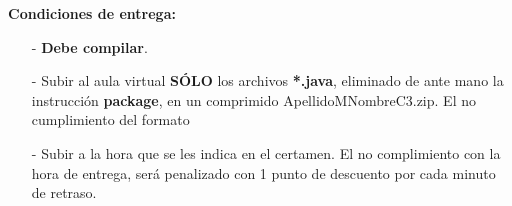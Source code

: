 \documentclass[10pt]{article}
\begin{document}
{\begin{enumerate}
\textbf{Condiciones de entrega:}
\begin{itemize}
    \item[-] \textbf{Debe compilar}.  
    \item[-] Subir al aula virtual \textbf{S\'OLO} los archivos \textbf{*.java}, eliminado de ante mano la instrucci\'on \textbf{package}, en un comprimido ApellidoMNombreC3.zip. El no cumplimiento del formato 
    \item[-] Subir a la hora que se les indica en el certamen. El no complimiento con la hora de entrega, ser\'a penalizado con 1 punto de descuento por cada minuto de retraso.
\end{itemize}


\end{enumerate}
}
\end{document}
